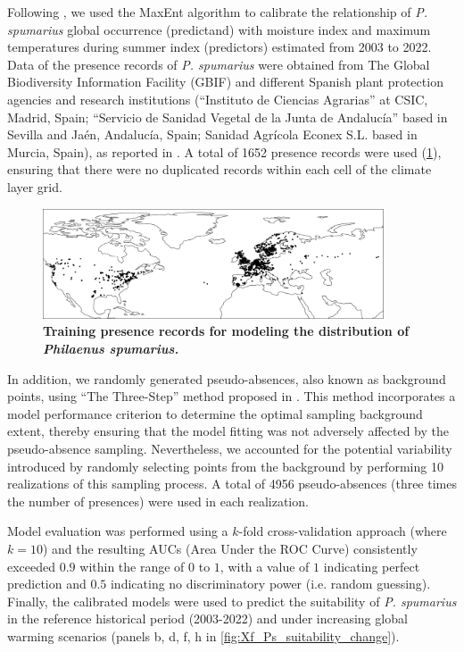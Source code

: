 Following \cite{Godefroid2022_vector}, we used the MaxEnt
\cite{phillips_maximum_2006} algorithm to calibrate the relationship of
\textit{P. spumarius} global occurrence (predictand) with moisture index and
maximum temperatures during summer index (predictors) estimated from 2003 to
2022. Data of the presence records of \textit{P. spumarius} were obtained from
The Global Biodiversity Information Facility (GBIF)
\cite{noauthor_what_nodate,GBIF} and different Spanish plant
protection agencies and research institutions (``Instituto de Ciencias
Agrarias'' at CSIC, Madrid, Spain; ``Servicio de Sanidad Vegetal de la Junta de
Andalucía'' based in Sevilla and Jaén, Andalucía, Spain; Sanidad Agrícola
Econex S.L. based in Murcia, Spain), as reported in
\cite{Godefroid2022_vector}. A total of 1652 presence records were used
(\cref{fig:Ps_presence_map}), ensuring that there were no duplicated records
within each cell of the climate layer grid.

\begin{figure}[ht]
    \centering
    \includegraphics[width=0.9\textwidth]{Figures/Ps_presence_map.pdf}
    \caption[Training presence records for modeling the
        distribution of \textit{Philaenus spumarius.}]{\textbf{Training
            presence
            records for modeling the
            distribution of \textit{Philaenus spumarius.}}}
    \label{fig:Ps_presence_map}
\end{figure}

In addition, we randomly generated pseudo-absences, also known as
background points, using ``The Three-Step'' method proposed in
\cite{iturbide_framework_2015}. This method incorporates a model performance
criterion to determine the optimal sampling background extent, thereby ensuring
that the model fitting was not adversely affected by the pseudo-absence
sampling. Nevertheless, we accounted for the potential variability introduced
by randomly selecting points from the background by performing 10 realizations
of this sampling process. A total of 4956 pseudo-absences (three times the
number of presences) were used in each realization.

Model evaluation was performed using a $k$-fold cross-validation approach
(where $k = 10$) and the resulting AUCs (Area Under the ROC Curve) consistently
exceeded $0.9$ within the range of $0$ to $1$, with a value of $1$ indicating
perfect prediction and $0.5$ indicating no discriminatory power (i.e. random
guessing). Finally, the calibrated models were used to predict the suitability
of \textit{P. spumarius} in the reference historical period (2003-2022) and
under increasing global warming scenarios (panels b, d, f, h in
\cref{fig:Xf_Ps_suitability_change}).

